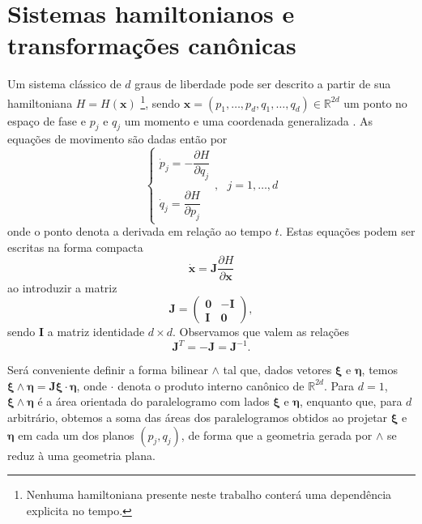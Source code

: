 \documentclass[
	12pt,
	oneside,			%
	a4paper,			%
	english,			%
	brazil				%
	]{abntex2}
\theoremstyle{definition}
\begin{document}
\section{Sistemas hamiltonianos e transformações canônicas}
\label{Sistemas hamiltonianos e transformações canônicas}

Um sistema clássico de $d$ graus de liberdade pode ser descrito a partir de sua hamiltoniana $H = H(\mathbf{x}) $ \footnote{Nenhuma hamiltoniana presente neste trabalho conterá uma dependência explicita no tempo.}, sendo $\mathbf{x} = (p_1,\ldots,p_d,q_1,\ldots,q_d) \in \mathbb{R}^{2d}$ um ponto no espaço de fase e $p_j$ e $q_j$ um momento e uma coordenada generalizada . As equações de movimento são dadas então por
\begin{equation}
    \begin{cases}
        \dot{p}_j = -\dfrac{\partial H}{\partial q_j} \\ \\
        \dot{q}_j = \dfrac{\partial H}{\partial p_j}
    \end{cases}, \ \ \ j=1,\ldots,d
\end{equation}
onde o ponto denota a derivada em relação ao tempo $t$. Estas equações podem ser escritas na forma compacta 
\begin{equation}
    \label{equações de hamilton}
    \dot{\mathbf{x}} = \mathbf{J} \frac{\partial H}{\partial \mathbf{x}}
\end{equation}
ao introduzir a matriz
\begin{equation}
\label{matriz J}
    \mathbf{J} = \left( 
    \begin{array}{c|c} 
        \boldsymbol{0} & -\mathbf{I} \\ 
        \hline 
        \mathbf{I} & \boldsymbol{0} 
    \end{array} 
    \right),
\end{equation}
sendo $\mathbf{I}$ a matriz identidade $d\times d$. Observamos que valem as relações
\begin{equation}
\label{relações uteis J}
    \mathbf{J}^T = - \mathbf{J} = \mathbf{J}^{-1}.
\end{equation}

Será conveniente definir a forma bilinear $\wedge$ tal que, dados vetores $\boldsymbol{\xi}$ e $\boldsymbol{\eta}$, temos $\boldsymbol{\xi}\wedge\boldsymbol{\eta} = \mathbf{J} \boldsymbol{\xi}\cdot \boldsymbol{\eta}$, onde $\cdot$ denota o produto interno canônico de $\mathbb{R}^{2d}$. Para $d=1$, $\boldsymbol{\xi}\wedge\boldsymbol{\eta}$ é a área orientada do paralelogramo com lados $\boldsymbol{\xi}$ e $\boldsymbol{\eta}$, enquanto que, para $d$ arbitrário, obtemos a soma das áreas dos paralelogramos obtidos ao projetar $\boldsymbol{\xi}$ e $\boldsymbol{\eta}$ em cada um dos planos $(p_j,q_j)$, de forma que a geometria gerada por $\wedge$ se reduz à uma geometria plana.
\end{document}
